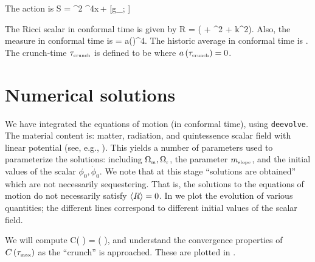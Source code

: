 \documentclass[amsmath,amssymb,12pt,eqsecnum]{revtex4}
\begin{document}
The action is
\bea
S = ^2 \int \dd^4x\, + [g_{\mu\nu}; \Psi]
\eea

The Ricci scalar in conformal time is given by
\bea
R = \left( \dot{\hct} + \hct^2 + k^2\right).
\eea
Also, the measure in conformal time is
\bea
{} = a(\tau)^4.
\eea 
The historic average in conformal time is
\bea
{}  {}.
\eea
The crunch-time ${\tau}_{\scriptscriptstyle{\textrm{crunch}}}$ is defined to be where $a\left({\tau}_{\scriptscriptstyle{\textrm{crunch}}}\right)=0$.

\section{Numerical solutions}
We have integrated the equations of motion (in conformal time), using {\tt deevolve}. The material content is: matter, radiation, and quintessence scalar field with linear potential (see, e.g., \cite{Kallosh:2003bq}). This yields a number of parameters used to parameterize the solutions: including ${\Omega}_{\scriptscriptstyle{\textrm{m}}}, {\Omega}_{\scriptscriptstyle{\textrm{r}}}$, the parameter ${m}_{\scriptscriptstyle{\textrm{slope}}}$, and the initial values of the scalar $\phi_0, \dot{\phi}_0$. We note that at this stage ``solutions are obtained'' which are not necessarily sequestering. That is, the solutions to the equations of motion do not necessarily satisfy $\left\langle R\right\rangle=0$. In  we plot the evolution of various quantities; the different lines correspond to different  initial values of the scalar field.

We will compute
\bea
C\left( \right)  {} = \left( \right),
\eea
and understand the convergence properties of $C\left( {\tau}_{\scriptscriptstyle{\textrm{max}}}\right)$ as the ``crunch'' is approached. These are plotted in .
\end{document}
